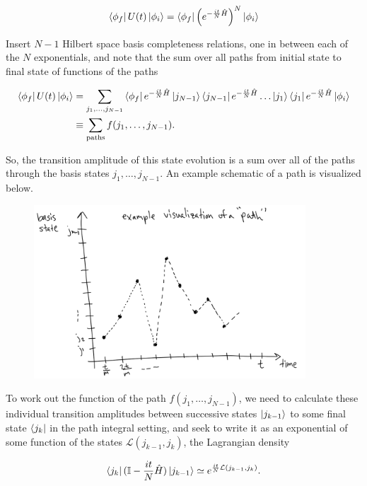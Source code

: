 \begin{equation}
\bra{\phi_f} U(t) \ket{\phi_i} = \bra{\phi_f}  \left( e^{-\frac{it}{N}\hat{H}}  \right) ^N \ket{\phi_i}
\end{equation}

\noindent Insert  $N-1$ Hilbert space basis completeness relations, one in between each of the $N$ exponentials, and note that the sum over all paths from initial state to final state of functions of the paths

\begin{align}
\bra{\phi_f} U(t) \ket{\phi_i} &= \sum_{j_1,\dots,j_{N-1}} \bra{\phi_f} e^{-\frac{it}{N}\hat{H}} \ket{j_{N-1}}\bra{j_{N-1}} e^{-\frac{it}{N}\hat{H}} \dots \ket{j_1}\bra{j_1} e^{-\frac{it}{N}\hat{H}} \ket{\phi_i} \\
&\equiv \sum_{\text{paths}} f(j_1, \dots , j_{N-1}).
\end{align}

\noindent So, the transition amplitude of this state evolution is a sum over all of the paths through the basis states $j_1,\dots,j_{N-1}$. An example schematic of a path is visualized below.

\begin{figure}[H]
	\centering
	\includegraphics[width=4in]{images/pathviz.png}
	\caption*{}
\end{figure}

\noindent To work out the function of the path $f(j_1, \dots, j_{N-1})$, we need to calculate these individual transition amplitudes between successive states $\ket{j_{k-1}}$ to some final state $\bra{j_k}$ in the path integral setting, and seek to write it as an exponential of some function of the states $\mathcal{L}(j_{k-1}, j_k)$, the Lagrangian density

\begin{equation}
\bra{j_k} (\mathbb{I} - \frac{it}{N} \hat{H}) \ket{j_{k-1}} \simeq e^{\frac{it}{N} \mathcal{L}(j_{k-1}, j_k)}.
\end{equation}

